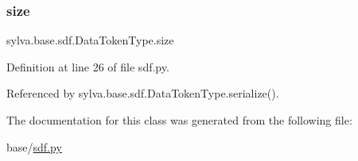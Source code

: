\mbox{\label{classsylva_1_1base_1_1sdf_1_1_data_token_type_abf397c07db4eced64bf773de13fcbbf0}} 
\subsubsection{\texorpdfstring{size}{size}}
{\footnotesize\ttfamily sylva.\+base.\+sdf.\+Data\+Token\+Type.\+size}



Definition at line 26 of file sdf.\+py.



Referenced by sylva.\+base.\+sdf.\+Data\+Token\+Type.\+serialize().



The documentation for this class was generated from the following file\+:\begin{DoxyCompactItemize}
\item 
base/\hyperlink{sdf_8py}{sdf.\+py}\end{DoxyCompactItemize}
